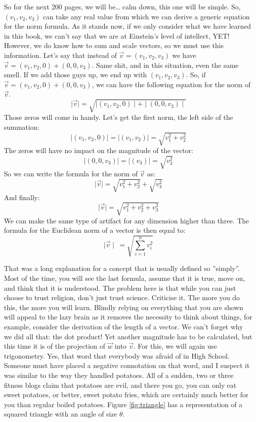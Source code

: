 \documentclass[a4,12pt,twosided,openany]{memoir}
\begin{document}
\par 
\indent
So for the next 200 pages, we will be… calm down, this one will be simple. So, $(v_1,v_2,v_3)$ can take any real value from which we can derive a generic equation for the norm formula. As it stands now, if we only consider what we have learned in this book, we can’t say that we are at Einstein’s level of intellect, YET! However, we do know how to sum and scale vectors, so we must use this information. Let’s say that instead of $\overrightarrow{v} = (v_1,v_2,v_3)$  we have $\overrightarrow{v} = (v_1,v_2,0) + (0,0,v_3)$. Same shit, and in this situation, even the same smell. If we add those guys up, we end up with $(v_1,v_2,v_3)$. So, if $\overrightarrow{v} = (v_1,v_2,0) + (0,0,v_3)$, we can have the following equation for the norm of $\overrightarrow{v}$.
\[\mid \overrightarrow{v} \mid = \sqrt{\mid(v_1,v_2,0)\mid + \mid(0,0,v_3)\mid}\]
Those zeros will come in handy. Let’s get the first norm, the left side of the summation:
\[\mid(v_1,v_2,0)\mid = \mid(v_1,v_2)\mid  = \sqrt{v_1^{2} + v_2^{2}} \]
The zeros will have no impact on the magnitude of the vector:
\[ \mid(0,0,v_3)\mid =  \mid(v_3)\mid = \sqrt{v_3^{2}} \]
So we can write the formula for the norm of $\overrightarrow{v}$ as:
\[\mid \overrightarrow{v}\mid =  \sqrt{v_1^{2} + v_2^{2}} + \sqrt{v_3^{2}}\]
And finally:
\[\mid \overrightarrow{v}\mid =  \sqrt{v_1^{2} + v_2^{2} + v_3^{2}}\]
We can make the same type of artifact for any dimension higher than three. The formula for the Euclidean norm of a vector is then equal to:
\[\mid \overrightarrow{v} \mid\  =  \sqrt{\sum_{i=1}^{n} v_i^{2}}\]
\par 
\indent
That was a long explanation for a concept that is usually defined so ”simply”. Most of the time, you will see the last formula, assume that it is true, move on, and think that it is understood. The problem here is that while you can just choose to trust religion, don’t just trust science. Criticise it. The more you do this, the more you will learn. Blindly relying on everything that you are shown will appeal to the lazy brain as it removes the necessity to think about things, for example, consider the derivation of the length of a vector. We can’t forget why we did all that: the dot product! Yet another magnitude has to be calculated, but this time it is of the projection of $\overrightarrow{w}$ into $\overrightarrow{v}$. For this, we will again use trigonometry. Yes, that word that everybody was afraid of in High School. Someone must have placed a negative connotation on that word, and I suspect it was similar to the way they handled potatoes. All of a sudden, two or three fitness blogs claim that potatoes are evil, and there you go, you can only eat sweet potatoes, or better, sweet potato fries, which are certainly much better for you than regular boiled potatoes. Figure \ref{fig:triangle} has a representation of a squared triangle with an angle of size $\theta$. 
\end{document}
